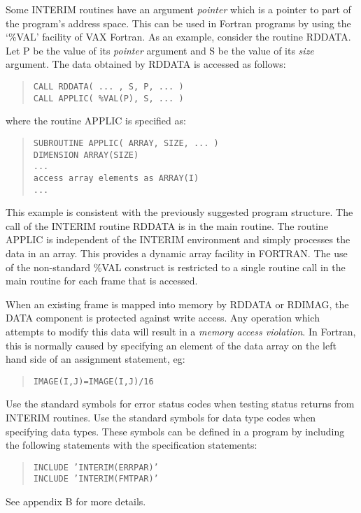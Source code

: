 Some INTERIM routines have an argument {\em pointer} which is a pointer to part of
the program's address space.
This can be used in Fortran programs by using the `\%VAL' facility of VAX
Fortran.
As an example, consider the routine RDDATA.
Let P be the value of its {\em pointer} argument and S be the value of its
{\em size} argument.
The data obtained by RDDATA is accessed as follows:
\begin{quote}
{\tt CALL RDDATA( ... , S, P, ... )\\
CALL APPLIC( \%VAL(P), S, ... )}
\end{quote}
where the routine APPLIC is specified as:
\begin{quote}
{\tt SUBROUTINE APPLIC( ARRAY, SIZE, ... )\\
DIMENSION ARRAY(SIZE)\\
\hspace{10mm}...\\
access array elements as ARRAY(I)\\
\hspace{10mm}...}
\end{quote}
This example is consistent with the previously suggested program structure.
The call of the INTERIM routine RDDATA is in the main routine.
The routine APPLIC is independent of the INTERIM environment and simply
processes the data in an array.
This provides a dynamic array facility in FORTRAN.
The use of the non-standard \%VAL construct is restricted to a single routine
call in the main routine for each frame that is accessed.

When an existing frame is mapped into memory by RDDATA or RDIMAG, the DATA
component is protected against write access.
Any operation which attempts to modify this data will result in a {\em memory
access violation}.
In Fortran, this is normally caused by specifying an element of the data array
on the left hand side of an assignment statement, eg:
\begin{quote}
{\tt IMAGE(I,J)=IMAGE(I,J)/16}
\end{quote}
Use the standard symbols for error status codes when testing status returns
from INTERIM routines.
Use the standard symbols for data type codes when specifying data types.
These symbols can be defined in a program by including the following statements
with the specification statements:
\begin{quote}
{\tt INCLUDE 'INTERIM(ERRPAR)'\\
INCLUDE 'INTERIM(FMTPAR)'}
\end{quote}
See appendix B for more details.

